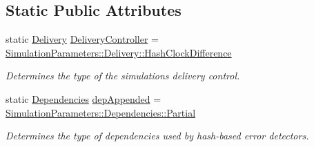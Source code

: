 \subsection*{Static Public Attributes}
\begin{DoxyCompactItemize}
\item 
static \hyperlink{class_simulation_parameters_ae08444273809241f502aa422205f7307}{Delivery} \hyperlink{class_simulation_parameters_ab379e91439dd9d4179096d30f930d459}{Delivery\+Controller} = \hyperlink{class_simulation_parameters_ae08444273809241f502aa422205f7307a9a46ad9fb926b8b78ba9395f96aa6af0}{Simulation\+Parameters\+::\+Delivery\+::\+Hash\+Clock\+Difference}
\begin{DoxyCompactList}\small\item\em Determines the type of the simulation\textquotesingle{}s delivery control. \end{DoxyCompactList}\item 
static \hyperlink{class_simulation_parameters_afb3b6aaecd4b19ef1991c870c8402dff}{Dependencies} \hyperlink{class_simulation_parameters_ad0c30ae3194fb07ca8a456331fce1add}{dep\+Appended} = \hyperlink{class_simulation_parameters_afb3b6aaecd4b19ef1991c870c8402dffa44ffd38a6dea695cbe2b34efdcc6cf27}{Simulation\+Parameters\+::\+Dependencies\+::\+Partial}
\begin{DoxyCompactList}\small\item\em Determines the type of dependencies used by hash-\/based error detectors. \end{DoxyCompactList}\end{DoxyCompactItemize}

